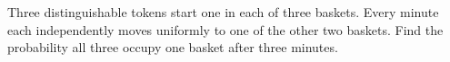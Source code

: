 Three distinguishable tokens start one in each of three baskets. Every minute each independently moves uniformly to one of the other two baskets. Find the probability all three occupy one basket after three minutes.
